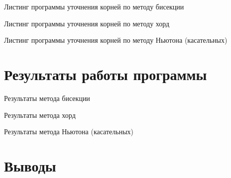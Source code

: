 Листинг программы уточнения корней по методу бисекции
\lstset{inputencoding=utf8, extendedchars=\true}


Листинг программы уточнения корней по методу хорд
\lstset{inputencoding=utf8, extendedchars=\true}


Листинг программы уточнения корней по методу Ньютона (касательных)
\lstset{inputencoding=utf8, extendedchars=\true}


\chapter{Результаты работы программы}

Результаты метода бисекции
\lstset{inputencoding=utf8, extendedchars=\true}


Результаты метода хорд
\lstset{inputencoding=utf8, extendedchars=\true}


Результаты метода Ньютона (касательных)
\lstset{inputencoding=utf8, extendedchars=\true}


\chapter*{Выводы}


